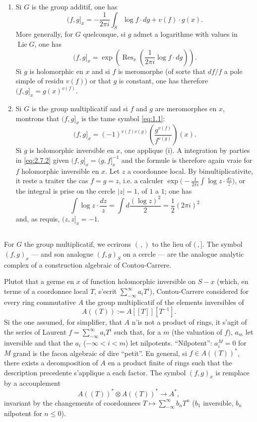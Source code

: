 \documentclass[12pt,a4paper]{article}
\theoremstyle{plain}
\theoremstyle{definition}
\theoremstyle{remark}
\DeclareMathOperator{\Res}{Res}
\begin{document}
\begin{enumerate}[label=(\roman*)]
\item Si $G$ is the group additif, one has
\[
(f,g]_x = -\frac{1}{2\pi i} \int_S \log f \cdot dg + v(f) \cdot g(x).
\]
More generally, for $G$ quelconque, si $g$ admet a logarithme with values in $\operatorname{Lie} G$,
one has
\[
(f,g]_x = \exp\left(\Res_x\left(\frac{1}{2\pi i} \log f \cdot dg\right)\right).
\]
Si $g$ is holomorphic en $x$ and si $f$ is meromorphe (of sorte that $df/f$ a pole simple
of residu $v(f)$) or that $g$ is constant, one has therefore $(f,g]_x = g(x)^{v(f)}$.

\item Si $G$ is the group multiplicatif and si $f$ and $g$ are meromorphes en $x$, montrons
that $(f,g]_x$ is the tame symbol \eqref{eq:1.1}:
\[
(f,g]_x = (-1)^{v(f)v(g)} \left(\frac{g^{v(f)}}{f^{v(g)}}\right)(x).
\]
Si $g$ is holomorphic inversible en $x$, one applique (i). A integration by parties
in \eqref{eq:2.7.2} given $(f,g]_x = (g,f]_x^{-1}$ and the formule is therefore again vraie for $f$
holomorphic inversible en $x$. Let $z$ a coordonnee local. By bimultiplicativite, it reste a
traiter the cas $f = g = z$, i.e. a calculer $\exp\bigl(-\frac{1}{2\pi i} \int \log z \cdot \frac{dz}{z}\bigr)$, or the integral is prise
on the cercle $|z| = 1$, of $1$ a $1$; one has
\[
\int \log z \cdot \frac{dz}{z} = \int d\frac{(\log z)^2}{2} = \frac{1}{2}(2\pi i)^2
\]
and, as requis, $(z,z]_x = -1$.
\end{enumerate}

\subsection{}

For $G$ the group multiplicatif, we ecrirons $(\,,)$ to the lieu of $(\,,]$. The symbol $(f,g)_x$ --- and son analogue $(f,g)_S$ on a cercle --- are the analogue analytic complex
of a construction algebraic of Contou-Carrere.

Plutot that a germe en $x$ of function holomorphic inversible on $S - x$ (which, en
terme of a coordonnee local $T$, s'ecrit $\sum_{-\infty}^{\infty} a_i T^i$), Contou-Carrere considered for every
ring commutative $A$ the group multiplicatif of the elements inversibles of
\[
A((T)) := A[[T]][T^{-1}].
\]
Si the one assumed, for simplifier, that $A$ n'is not a product of rings, it s'agit of the series
of Laurent $f = \sum_{-\infty}^{\infty} a_i T^i$ such that, for a $m$ (the valuation of $f$), $a_m$ let inversible and
that the $a_i$ ($-\infty < i < m$) let nilpotents. ``Nilpotent'': $a_i^M = 0$ for $M$ grand is
the facon algebraic of dire ``petit''. En general, si $f \in A((T))^*$, there exists a decomposition of $A$ en a product finite of rings such that the description precedente s'applique
a each factor. The symbol $(f,g)_x$ is remplace by a accouplement
\begin{equation}\label{eq:2.9.1}
A((T))^* \otimes A((T))^* \to A^*,
\end{equation}
invariant by the changements of coordonnees $T \mapsto \sum_{-\infty}^{\infty} b_n T^n$ ($b_1$ inversible, $b_n$ nilpotent
for $n \leq 0$).
\end{document}
